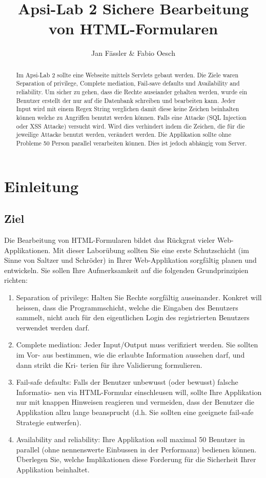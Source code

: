 \documentclass[10pt]{article}
\title{ %
Apsi-Lab 2
\vspace{0.2cm}
\Large Sichere Bearbeitung von HTML-Formularen}
\author{Jan Fässler \& Fabio Oesch}
\begin{document}
\maketitle
\thispagestyle{firststyle}
\pagestyle{firststyle}
\begin{abstract}
\begin{center}
Im Apsi-Lab 2 sollte eine Webseite mittels Servlets gebaut werden. Die Ziele waren Separation of privilege, Complete mediation, Fail-save defaults und Availability and reliability. Um sicher zu gehen, dass die Rechte auseiander gehalten werden, wurde ein Benutzer erstellt der nur auf die Datenbank schreiben und bearbeiten kann. Jeder Input wird mit einem Regex String verglichen damit diese keine Zeichen beinhalten können welche zu Angriffen benutzt werden können. Falls eine Attacke (SQL Injection oder XSS Attacke) versucht wird. Wird dies verhindert indem die Zeichen, die für die jeweilige Attacke benutzt werden, verändert werden. Die Applikation sollte ohne Probleme 50 Person parallel verarbeiten können. Dies ist jedoch abhängig vom Server.
\end{center}
\vspace{0.5cm}
\hrulefill
\end{abstract}

\pagestyle{documentstyle}
\tableofcontents
\pagebreak
\section{Einleitung}
\subsection{Ziel}
Die Bearbeitung von HTML-Formularen bildet das Rückgrat vieler Web-Applikationen. Mit
dieser Laborübung sollten Sie eine erste Schutzschicht (im Sinne von Saltzer und Schröder)
in Ihrer Web-Applikation sorgfältig planen und entwickeln. Sie sollen Ihre Aufmerksamkeit
auf die folgenden Grundprinzipien richten:
\begin{enumerate}
 \item  Separation of privilege: Halten Sie Rechte sorgfältig auseinander. Konkret will heissen,
dass die Programmschicht, welche die Eingaben des Benutzers sammelt, nicht auch für
den eigentlichen Login des registrierten Benutzers verwendet werden darf.
 \item  Complete mediation: Jeder Input/Output muss verifiziert werden. Sie sollten im Vor-
aus bestimmen, wie die erlaubte Information aussehen darf, und dann strikt die Kri-
terien für ihre Validierung formulieren.
 \item  Fail-safe defaults: Falls der Benutzer unbewusst (oder bewusst) falsche Informatio-
nen via HTML-Formular einschleusen will, sollte Ihre Applikation nur mit knappen
Hinweisen reagieren und vermeiden, dass der Benutzer die Applikation allzu lange
beansprucht (d.h. Sie sollten eine geeignete fail-safe Strategie entwerfen).
 \item  Availability and reliability: Ihre Applikation soll maximal 50 Benutzer in parallel (ohne
nennenswerte Einbussen in der Performanz) bedienen können. Überlegen Sie, welche
Implikationen diese Forderung für die Sicherheit Ihrer Applikation beinhaltet.
\end{enumerate}
\end{document}
